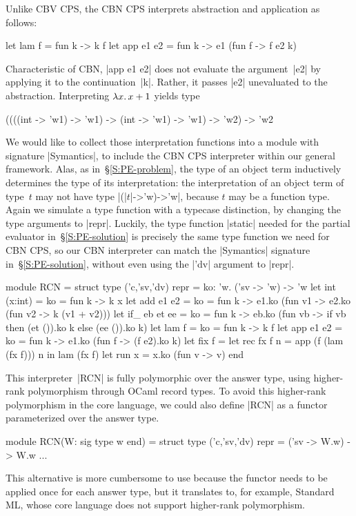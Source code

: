 Unlike CBV CPS, the CBN CPS interprets
abstraction and application as follows:
\begin{code}
let lam f = fun k -> k f
let app e1 e2 = fun k -> e1 (fun f -> f e2 k)
\end{code}
Characteristic of CBN, |app e1 e2|
does not evaluate the argument~|e2| by applying it to the
continuation~|k|. Rather, it passes |e2| unevaluated to the abstraction.
Interpreting $\mathopen{\lambda\mathord{x}.\,} x+1$ yields type
\begin{code}
((((int -> 'w1) -> 'w1) -> (int -> 'w1) -> 'w1) -> 'w2) -> 'w2
\end{code}

We would like to collect those interpretation functions into a module
with signature |Symantics|, to include the CBN CPS interpreter within our
general framework. Alas, as in~\S\ref{S:PE-problem}, the type of
an object term inductively determines the type of its interpretation:
the interpretation of an object term of type~$t$ may not have type
|(|$t$|->'w)->'w|, because $t$ may be a function type.  Again we
simulate a type function with a typecase distinction, by changing the
type arguments to |repr|. Luckily, the type function |static| needed for
the partial evaluator 
in~\S\ref{S:PE-solution} is precisely the same type function we
need for CBN CPS\@, so our CBN interpreter can match the
|Symantics| signature in~\S\ref{S:PE-solution}, without even
using the |'dv| argument to |repr|.
\begin{code}
module RCN = struct
  type ('c,'sv,'dv) repr = {ko: 'w. ('sv -> 'w) -> 'w}
  let int (x:int) = {ko = fun k -> k x}
  let add e1 e2 = {ko = fun k ->
      e1.ko (fun v1 -> e2.ko (fun v2 -> k (v1 + v2)))}
  let if_ eb et ee = {ko = fun k ->
      eb.ko (fun vb -> if vb then (et ()).ko k else (ee ()).ko k)}
  let lam f = {ko = fun k -> k f}
  let app e1 e2 = {ko = fun k -> e1.ko (fun f -> (f e2).ko k)}
  let fix f = let rec fx f n = app (f (lam (fx f))) n in lam (fx f)
  let run x = x.ko (fun v -> v)
end
\end{code}

This interpreter~|RCN| is fully polymorphic over the answer type,
using higher-rank polymorphism through OCaml record types.
To avoid this higher-rank polymorphism in the core language,
we could also define |RCN| as
a functor parameterized over
the answer type.
\begin{code}
module RCN(W: sig type w end) = struct
  type ('c,'sv,'dv) repr = ('sv -> W.w) -> W.w   ...
\end{code}
This alternative is more cumbersome to use because the functor
needs to be applied once for each answer type, but it translates
to, for example, Standard ML\@, whose core language does not
support higher-rank polymorphism.

